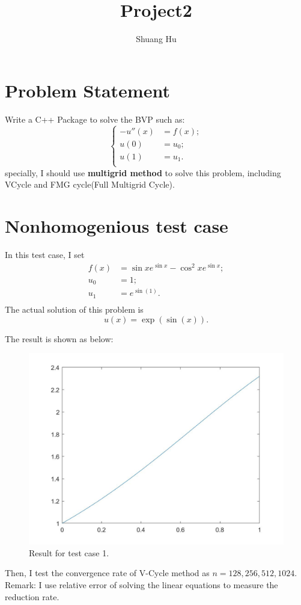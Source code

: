 \documentclass[UTF8]{ctexart}
\title{Project2}
\author{Shuang Hu}
\theoremstyle{plain}
\theoremstyle{definition}
\theoremstyle{remark}
\begin{document}
\maketitle
\section{Problem Statement}

Write a C++ Package to solve the BVP such as:
$$
\left\{
\begin{aligned}
-u''(x)&=f(x);\\
u(0)&=u_{0};\\
u(1)&=u_{1}.\\
\end{aligned}
\right.
$$
specially, I should use \textbf{multigrid method} to solve this problem, including VCycle and FMG cycle(Full Multigrid Cycle).
\section{Nonhomogenious test case}
In this test case, I set 
$$
\begin{aligned}
f(x)&=\sin xe^{\sin x}-\cos^{2}xe^{\sin x};\\
u_{0}&=1;\\
u_{1}&=e^{\sin(1)}.\\
\end{aligned}
$$
The actual solution of this problem is
$$
u(x)=\exp(\sin(x)).
$$

The result is shown as below:
\begin{figure}[H]
\centering
\includegraphics[height=0.2\textheight,width=0.5\linewidth]{1}
\caption{Result for test case 1.}
\end{figure}

Then, I test the convergence rate of V-Cycle method as $n=128,256,512,1024.$ Remark: I use relative error of solving the linear equations to measure the reduction rate.
\end{document}
